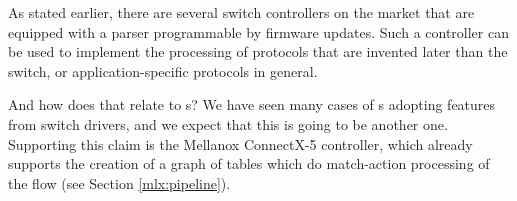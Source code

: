 As stated earlier, there are several switch controllers on the market that are
equipped with a parser programmable by firmware updates. Such a controller can be
used to implement the processing of protocols that are invented later than the
switch, or application-specific protocols in general.

And how does that relate to s? We have seen many cases of s adopting
features from switch drivers, and we expect that this is going to be another
one. Supporting this claim is the Mellanox ConnectX-5 controller, which already
supports the creation of a graph of tables which do match-action processing of
the flow (see Section \ref{mlx:pipeline}).



%
% 
%

